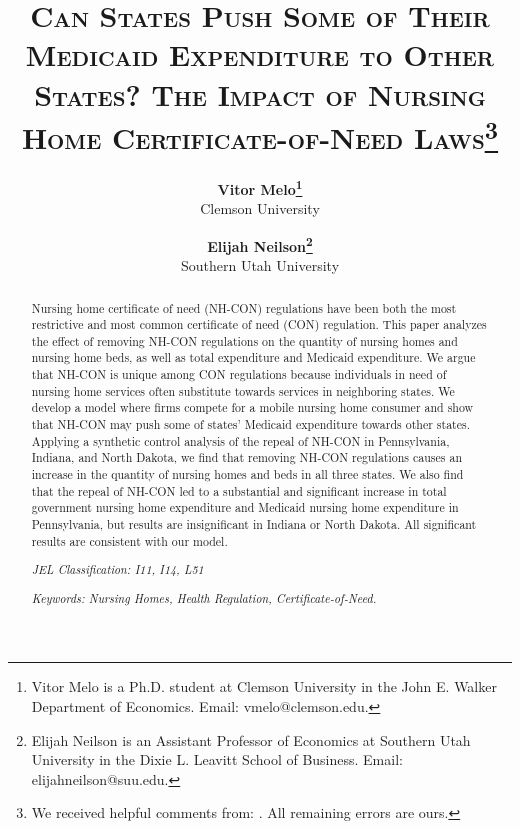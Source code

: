\documentclass[12pt]{article}
\begin{document}

\title{\textsc{Can States Push Some of Their Medicaid Expenditure to Other States? The Impact of Nursing Home Certificate-of-Need Laws}\thanks{We received helpful comments from: . All remaining errors are ours.}\\
	$~$\\}

\medskip

\author{\textbf{Vitor Melo\protect\thanks{Vitor Melo is a Ph.D. student at Clemson University in the John E. Walker Department of Economics. Email: vmelo@clemson.edu.}} \\ Clemson University
\and
\textbf{Elijah Neilson\protect\thanks{Elijah Neilson is an Assistant Professor of Economics at Southern Utah University in the Dixie L. Leavitt School of Business. Email: elijahneilson@suu.edu.}} \\ Southern Utah University
  	}		

\date{}              %


\renewcommand{\thefootnote}{\fnsymbol{footnote}}

\singlespacing

\maketitle

\begin{abstract}
\noindent Nursing home certificate of need (NH-CON) regulations have been both the most restrictive and most common certificate of need (CON) regulation. This paper analyzes the effect of removing NH-CON regulations on the quantity of nursing homes and nursing home beds, as well as total expenditure and Medicaid expenditure. We argue that NH-CON is unique among CON regulations because individuals in need of nursing home services often substitute towards services in neighboring states. We develop a model where firms compete for a mobile nursing home consumer and show that NH-CON may push some of states’ Medicaid expenditure towards other states. Applying a synthetic control analysis of the repeal of NH-CON in Pennsylvania, Indiana, and North Dakota, we find that removing NH-CON regulations causes an increase in the quantity of nursing homes and beds in all three states. We also find that the repeal of NH-CON led to a substantial and significant increase in total government nursing home expenditure and Medicaid nursing home expenditure in Pennsylvania, but results are insignificant in Indiana or North Dakota. All significant results are consistent with our model.  



\bigskip
			
			\noindent\emph{JEL Classification: I11, I14, L51} 
			
			\bigskip
			
			\noindent\emph{Keywords: Nursing Homes, Health  Regulation, Certificate-of-Need. } 
\end{abstract}
\end{document}

